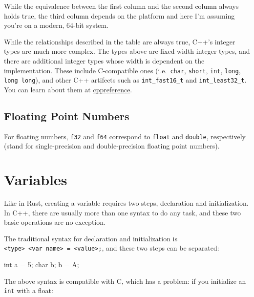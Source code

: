 \documentclass[
]{book}
\newenvironment{Shaded}{\begin{snugshade}}{\end{snugshade}}
\newcommand{\CharTok}[1]{\textcolor[rgb]{0.31,0.60,0.02}{#1}}
\newcommand{\DataTypeTok}[1]{\textcolor[rgb]{0.13,0.29,0.53}{#1}}
\newcommand{\DecValTok}[1]{\textcolor[rgb]{0.00,0.00,0.81}{#1}}
\newcommand{\NormalTok}[1]{#1}
\begin{document}
While the equivalence between the first column and the second column always holds true, the third column depends on the platform and here I'm assuming you're on a modern, 64-bit system.

While the relationships described in the table are always true, C++'s integer types are much more complex. The types above are fixed width integer types, and there are additional integer types whose width is dependent on the implementation. These include C-compatible ones (i.e.~\texttt{char}, \texttt{short}, \texttt{int}, \texttt{long}, \texttt{long\ long}), and other C++ artifects such as \texttt{int\_fast16\_t} and \texttt{int\_least32\_t}. You can learn about them at \href{https://en.cppreference.com/w/cpp/types/integer}{cppreference}.

\hypertarget{floating-point-numbers}{%
\subsection{Floating Point Numbers}\label{floating-point-numbers}}

For floating numbers, \texttt{f32} and \texttt{f64} correspond to \texttt{float} and \texttt{double}, respectively (stand for single-precision and double-precision floating point numbers).

\hypertarget{variables}{%
\section{Variables}\label{variables}}

Like in Rust, creating a variable requires two steps, declaration and initialization. In C++, there are usually more than one syntax to do any task, and these two basic operations are no exception.

The traditional syntax for declaration and initialization is \texttt{\textless{}type\textgreater{}\ \textless{}var\ name\textgreater{}\ =\ \textless{}value\textgreater{};}, and these two steps can be separated:

\begin{Shaded}
\begin{Highlighting}[]
\DataTypeTok{int}\NormalTok{ a = }\DecValTok{5}\NormalTok{;}
\DataTypeTok{char}\NormalTok{ b;}
\NormalTok{b = }\CharTok{\textquotesingle{}A\textquotesingle{}}\NormalTok{;}
\end{Highlighting}
\end{Shaded}

The above syntax is compatible with C, which has a problem: if you initialize an \texttt{int} with a float:
\end{document}
